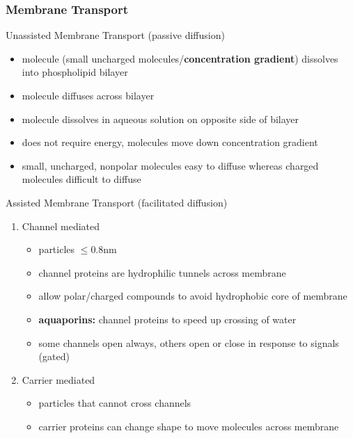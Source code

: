 \documentclass[11pt,fleqn]{book}
\begin{document}
\subsubsection{Membrane Transport}
\begin{descriptions}
    \item[Unassisted Membrane Transport (passive diffusion)]\begin{descriptions}
    \end{descriptions}
    \begin{itemize}
        \item molecule (small uncharged molecules/\textbf{concentration gradient}) dissolves into phospholipid bilayer
        \item molecule diffuses across bilayer
        \item molecule dissolves in aqueous solution on opposite side of bilayer
        \item does not require energy, molecules move down concentration gradient
        \item small, uncharged, nonpolar molecules easy to diffuse whereas charged molecules difficult to diffuse
    \end{itemize}
    \item[Assisted Membrane Transport (facilitated diffusion)]\begin{descriptions}
    \end{descriptions}
    \begin{enumerate}
        \item Channel mediated
        \begin{itemize}
            \item particles $\leq$0.8nm
            \item channel proteins are hydrophilic tunnels across membrane
            \item allow polar/charged compounds to avoid hydrophobic core of membrane
            \item \textbf{aquaporins:} channel proteins to speed up crossing of water
            \item some channels open always, others open or close in response to signals (gated)
        \end{itemize}
        \item Carrier mediated
        \begin{itemize}
            \item particles that cannot cross channels
            \item carrier proteins can change shape to move molecules across membrane

\end{itemize}
\end{enumerate}
\end{descriptions}
\end{document}
